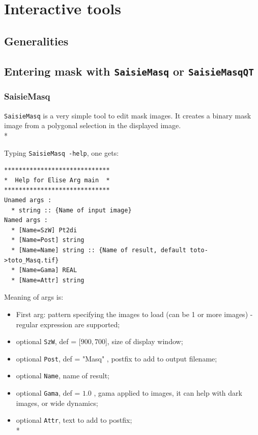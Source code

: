\chapter{Interactive tools}

\section{Generalities}


\section{Entering mask with {\tt SaisieMasq} or {\tt SaisieMasqQT} }

\subsection{SaisieMasq}

{\tt SaisieMasq} is a very simple tool to edit mask images.
It creates a binary mask image from a polygonal selection in the displayed image.\\*

Typing {\tt SaisieMasq -help}, one gets:

\begin{verbatim}
*****************************
*  Help for Elise Arg main  *
*****************************
Unamed args :
  * string :: {Name of input image}
Named args :
  * [Name=SzW] Pt2di
  * [Name=Post] string
  * [Name=Name] string :: {Name of result, default toto->toto_Masq.tif}
  * [Name=Gama] REAL
  * [Name=Attr] string
\end{verbatim}

Meaning of args is:

\begin{itemize}
   \item First arg: pattern specifying the images to load (can be 1 or more images) - regular expression are supported;
   \item optional {\tt SzW}, def = [$900,700$], size of display window;
   \item optional {\tt Post}, def = "Masq" , postfix to add to output filename;
   \item optional {\tt Name}, name of result;
   \item optional {\tt Gama}, def = $1.0$ , gama applied to images, it can help with dark images, or wide dynamics;
   \item optional {\tt Attr}, text to add to postfix;\\*
\end{itemize}


